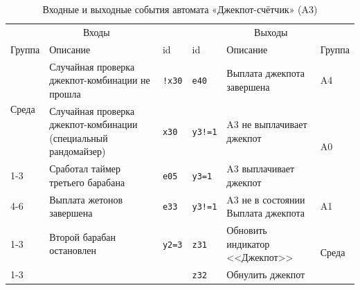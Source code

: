 \begin{table}[H]
\centering
\caption{Входные и выходные события автомата «Джекпот-счётчик» (A3)}
\small
\begin{tabular}{@{}p{1.3cm}p{4.6cm}l|lp{4.6cm}p{1.3cm}@{}}
\toprule
\multicolumn{3}{c}{Входы} & \multicolumn{3}{c}{Выходы} \\
Группа & Описание & id & id & Описание & Группа \\
\midrule
\multirow{2}{*}{Среда} & Случайная проверка джекпот-комбинации не прошла & \texttt{!x30} & \texttt{e40} & Выплата джекпота завершена & \multirow{1}{*}{A4} \\
\cline{4-6}
 & Случайная проверка джекпот-комбинации (специальный рандомайзер) & \texttt{x30} & \texttt{y3!=1} & A3 не выплачивает джекпот & \multirow{2}{*}{A0} \\
\cline{1-3}
\multirow{2}{*}{A0} & Сработал таймер третьего барабана & \texttt{e05} & \texttt{y3=1} & A3 выплачивает джекпот &  \\
\cline{4-6}
 & Выплата жетонов завершена & \texttt{e33} & \texttt{y3!=1} & A3 не в состоянии Выплата джекпота & \multirow{1}{*}{A1} \\
\cline{1-3}\cline{4-6}
\multirow{1}{*}{A2} & Второй барабан остановлен & \texttt{y2=3} & \texttt{z31} & Обновить индикатор <<Джекпот>> & \multirow{2}{*}{Среда} \\
\cline{1-3}
 &  &  & \texttt{z32} & Обнулить джекпот &  \\
\bottomrule
\end{tabular}
\end{table}